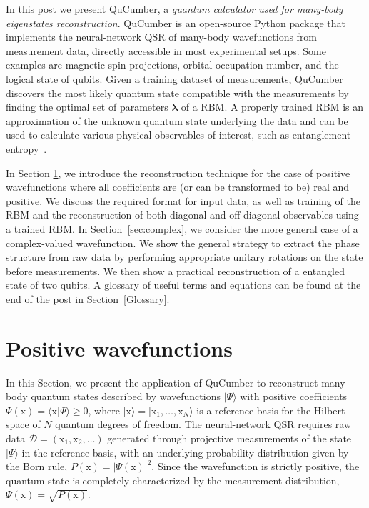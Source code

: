 \documentclass[submission, Phys, hidelinks]{SciPost}
\begin{document}
	In this post we present QuCumber, a {\it quantum calculator used for many-body eigenstates reconstruction}. QuCumber is an open-source Python package that implements the neural-network QSR of many-body wavefunctions from measurement data, directly accessible in most experimental setups. Some examples are magnetic spin projections, orbital occupation number, and the logical state of qubits. Given a training dataset of measurements, QuCumber discovers the most likely quantum state compatible with the measurements by finding the optimal set of parameters $\bm{\lambda}$ of a RBM. A properly trained RBM is an approximation of the unknown quantum state underlying the data and can be used to calculate various physical observables of interest, such as entanglement entropy~\cite{torlai2018tomography}.

	In Section \ref{sec:positive}, we introduce the reconstruction technique for the case of positive wavefunctions where all coefficients are (or can be transformed to be) real and positive. We discuss the required format for input data, as well as training of the RBM and the reconstruction of both diagonal and off-diagonal observables using a trained RBM. In Section~\ref{sec:complex}, we consider the more general case of a complex-valued wavefunction. We show the general strategy to extract the phase structure from raw data by performing appropriate unitary rotations on the state before measurements. We then show a practical reconstruction of a entangled state of two qubits. A glossary of useful terms and equations can be found at the end of the post in Section~\ref{Glossary}.

\section{Positive wavefunctions}\label{sec:positive}
	In this Section, we present the application of QuCumber to reconstruct many-body quantum states described by wavefunctions $|\Psi\rangle$ with positive coefficients $\Psi(\bm{\mathrm{x}})=\langle\bm{\mathrm{x}}|\Psi\rangle \ge0$, where $|\bm{\mathrm{x}}\rangle=|\mathrm{x}_1,\dots,\mathrm{x}_N\rangle$ is a reference basis for the Hilbert space of $N$ quantum degrees of freedom. The neural-network QSR requires raw data $\mathcal{D}=(\bm{\mathrm{x}}_1,\bm{\mathrm{x}}_2,\dots)$ generated through projective measurements of the state $|\Psi\rangle$ in the reference basis, with an underlying probability distribution given by the Born rule, $P(\bm{\mathrm{x}})=|\Psi(\bm{\mathrm{x}})|^2$. Since the wavefunction is strictly positive, the quantum state is completely characterized by the measurement distribution, $\Psi(\bm{\mathrm{x}})=\sqrt{P(\bm{\mathrm{x}})}$. 
\end{document}
